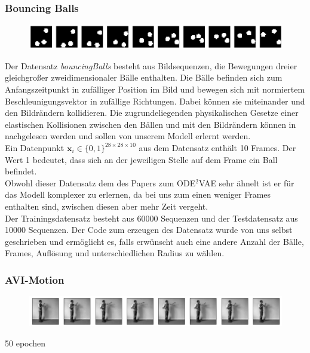 \documentclass[12pt]{article}
\newcommand{\x}{\mathbf{x}_i}
\begin{document}
	\subsubsection{Bouncing Balls}
	\begin{figure}[!htbp]
		\centering
		\includegraphics[scale=0.4]{bouncingBalls}
	\end{figure}
	Der Datensatz \emph{bouncingBalls} besteht aus Bildsequenzen, die Bewegungen dreier gleichgroßer zweidimensionaler Bälle enthalten. Die Bälle befinden sich zum Anfangszeitpunkt in zufälliger Position im Bild und bewegen sich mit normiertem Beschleunigungsvektor in zufällige Richtungen. Dabei können sie miteinander und den Bildrändern kollidieren.
	Die zugrundeliegenden physikalischen Gesetze einer elastischen Kollisionen zwischen den Bällen und mit den Bildrändern können in \cite{ElastKol} nachgelesen werden und sollen von unserem Modell erlernt werden. \\
	Ein Datenpunkt $\x\in \{0,1\}^{28\times 28\times 10}$ aus dem Datensatz enthält 10 Frames. Der Wert 1 bedeutet, dass sich an der jeweiligen
	Stelle auf dem Frame ein Ball befindet.\\
	Obwohl dieser Datensatz dem des Papers zum ODE$^2$VAE sehr ähnelt ist er für das Modell komplexer zu erlernen, da bei uns zum einen weniger Frames enthalten sind, zwischen diesen aber mehr Zeit vergeht.\\
	Der Trainingsdatensatz besteht aus 60000 Sequenzen und der Testdatensatz aus 10000 Sequenzen.
	Der Code zum erzeugen des Datensatz wurde von uns selbst geschrieben und ermöglicht es, falls erwünscht auch eine andere Anzahl der Bälle, Frames, Auflösung und unterschiedlichen Radius zu wählen.

	\subsubsection{AVI-Motion}
	\begin{figure}[!htbp]
		\centering
		\includegraphics[scale=0.5]{AVIMotion}
	\end{figure}
	50 epochen
\end{document}

